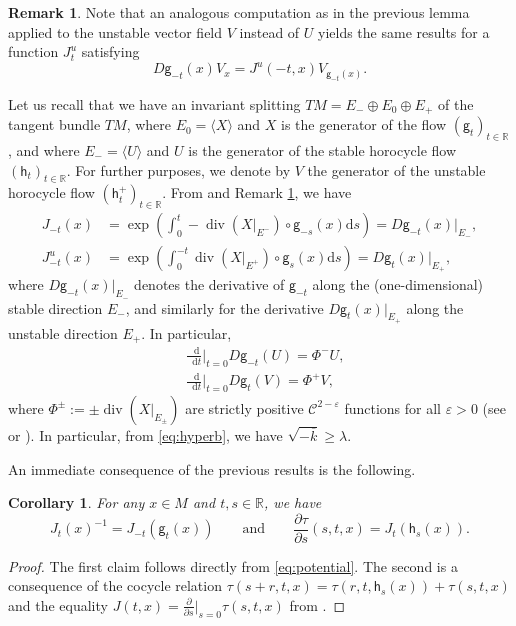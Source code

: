 \documentclass[11pt,letterpaper]{amsart}
\newcommand \R {{ \mathbb R}}
\newcommand \cC {{\mathscr{C}}}
\newcommand{\horo}{\mathsf{h}}
\newcommand{\geo}{\mathsf{g}}
\newcommand*{\diff}{\mathop{}\!\mathrm{d}}
\newtheorem{corollary}[theorem]{Corollary}
\theoremstyle{definition}
\newtheorem{remark}[theorem]{Remark}
\begin{document}
\begin{remark}\label{rmk:Ju}
Note that an analogous computation as in the previous lemma applied to the unstable vector field $V$ instead of $U$ yields the same results for a function $J^{u}_{t}$ satisfying 
\[
D\geo_{-t}(x)V_x=J^{u}(-t, x)V_{\geo_{-t}(x)}.
\]
\end{remark}




%
Let us recall that we have an invariant splitting $TM = E_{-} \oplus E_0 \oplus E_{+}$ of the tangent bundle $TM$, where $E_0=\langle X \rangle $ and $X$ is the generator of the flow $(\geo_t)_{t \in \R}$, and where $E_{-} = \langle U \rangle$ and $U$ is the generator of the stable horocycle flow $(\horo_t)_{t\in \R}$. For further purposes, we denote by $V$ the generator of the unstable horocycle flow $(\horo^+_t)_{t\in \R}$. From  and Remark \ref{rmk:Ju}, we have
 \begin{equation}\label{eq:potential}
 \begin{split}
 J_{-t}(x)&=\exp\left({\int_0^t -\operatorname{div} (X|_{E^-})\circ \geo_{-s}(x)\mathrm d s}\right)=D\geo_{-t}(x)|_{E_-},\\
  J^u_{-t}(x)&=\exp\left({\int_0^{-t} \operatorname{div} (X|_{E^+})\circ \geo_s(x)\mathrm d s}\right)=D\geo_{t}(x)|_{E_+},
 \end{split}
 \end{equation}
 where  $D\geo_{-t}(x)|_{E_-}$ denotes the derivative of $\geo_{-t}$ along the (one-dimensional) stable direction $E_-$, and similarly for the derivative $D\geo_{t}(x)|_{E_+}$ along the unstable direction $E_+$. 
In particular, 
\begin{equation}\label{eq:div}
\begin{split}
&\frac{\diff}{\diff t}\Big\vert_{t=0} D\geo_{-t}(U)=\Phi^- U,\\
&\frac{\diff}{\diff t}\Big\vert_{t=0} D\geo_{t}(V)=\Phi^+ V,
\end{split}
\end{equation}
where $\Phi^{\pm}:= \pm \operatorname{div}(X|_{E_{\pm}})$ are strictly positive $\cC^{2-\varepsilon}$ functions for all $\varepsilon > 0$ (see \cite[p.56-57]{HuKa} or \cite[(3.1)]{Gre}). 
%
In particular, from \eqref{eq:hyperb}, we have $\sqrt{-\overline k}\ge \lambda$.

An immediate consequence of the previous results is the following.
\begin{corollary}\label{cor:inverse_of_Jt}
	For any $x\in M$ and $t,s \in \R$, we have 
	\[
	J_t(x)^{-1} = J_{-t}(\geo_{t}(x)) \qquad \text{and} \qquad \frac{\partial \tau}{\partial s}(s,t,x) = J_t(\horo_s(x)).
	\]
\end{corollary}
\begin{proof}
	The first claim follows directly from \eqref{eq:potential}. The second is a consequence of the cocycle relation $\tau(s+r,t,x) = \tau(r,t,\horo_s(x)) + \tau(s,t,x)$ and the equality $J(t,x) = \frac{\partial}{\partial s}\big\vert_{s=0} \tau(s,t,x)$ from .
\end{proof}
%
\end{document}

